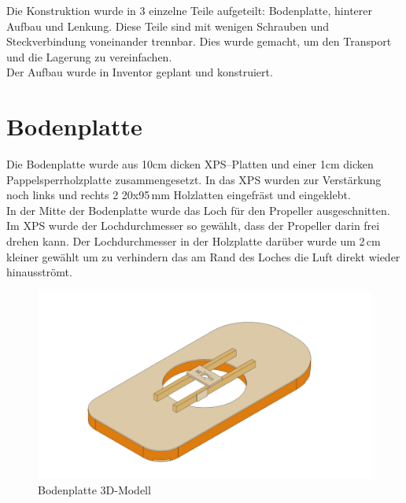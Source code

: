 Die Konstruktion wurde in 3 einzelne Teile aufgeteilt: Bodenplatte, hinterer Aufbau und Lenkung. Diese Teile sind mit wenigen Schrauben und Steckverbindung voneinander trennbar. Dies wurde gemacht, um den Transport und die Lagerung zu vereinfachen.\\
Der Aufbau wurde in Inventor geplant und konstruiert.


\clearpage
\section{Bodenplatte}
Die Bodenplatte wurde aus 10cm dicken XPS--Platten und einer 1cm dicken Pappelsperrholzplatte zusammengesetzt. In das XPS wurden zur Verstärkung noch links und rechts 2 20x95\,mm Holzlatten eingefräst und eingeklebt.\\ 
In der Mitte der Bodenplatte wurde das Loch für den Propeller ausgeschnitten. Im XPS wurde der Lochdurchmesser so gewählt, dass der Propeller darin frei drehen kann. Der Lochdurchmesser in der Holzplatte darüber wurde um 2\,cm kleiner gewählt um zu verhindern das am Rand des Loches die Luft direkt wieder hinausströmt.

\begin{figure}[H]
    \centering
    \includegraphics[width=\textwidth]{../../../../Inventor/Bodenplatte/png/BodenplatteHauptansicht.png}
    \caption{Bodenplatte 3D-Modell\label{fig:konst:bodenplatte:gesamt}}
\end{figure}

